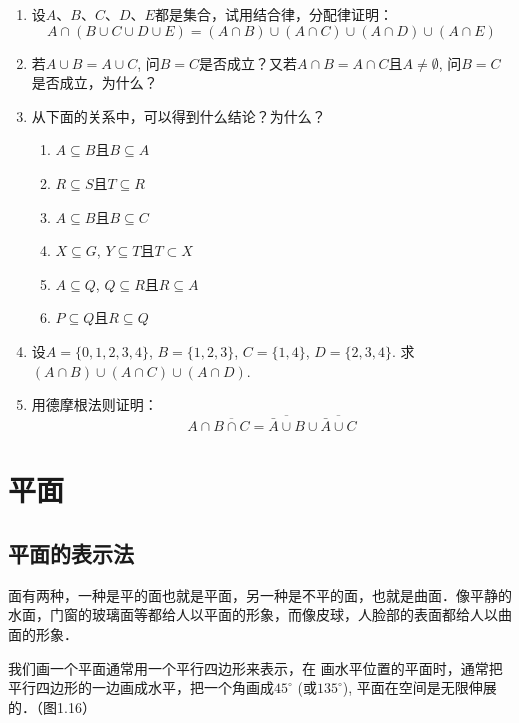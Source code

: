 \begin{enumerate}
\item   设$A$、$B$、$C$、$D$、$E$都是集合，试用结合律，分配律证明：
\[A\cap  (B\cup C\cup D\cup E)=(A\cap B)\cup (A\cap C)\cup (A\cap D)\cup (A\cap E)\] 
\item 若$A\cup B=A\cup C$, 问$B=C$是否成立？又若$A\cap B=A\cap C$且$A\ne \emptyset$, 问$B=C$是否成立，为什么？
\item 从下面的关系中，可以得到什么结论？为什么？
\begin{multicols}{2}
\begin{enumerate}
  \item $A\subseteq B$且$B\subseteq A$
  \item $R\subseteq S$且$T\subseteq R$
  \item $A\subseteq B$且$B\subseteq C$
  \item $X\subseteq G$, $Y\subseteq T$且$T\subset X$
  \item $A\subseteq Q$, $Q\subseteq R$且$R\subseteq A$
  \item $P\subseteq Q$且$R\subseteq Q$
\end{enumerate}
\end{multicols}

\item 设$A=\{0, 1, 2, 3, 4\}$, $B=\{1, 2, 3\}$, $C=\{1, 4\}$, 
  $D= \{2, 3, 4\}$. 求$(A\cap B)\cup (A\cap C)\cup (A\cap D)$.
\item 用德摩根法则证明：
\[A\cap \overline{B\cap C}=\overline{\bar A\cup B}\cup\overline{\bar A\cup C}\]
\end{enumerate}


\section{平面}

\subsection{平面的表示法}

面有两种，一种是平的面也就是平面，另一种是不平的面，也就是曲面．像平静的水面，门窗的玻璃面等都给人以平面的形象，而像皮球，人脸部的表面都给人以曲面的形象．

我们画一个平面通常用一个平行四边形来表示，在
画水平位置的平面时，通常把平行四边形的一边画成水平，把一个角画成$45^{\circ}$ (或$135^{\circ}$), 平面在空间是无限伸展的．（图1.16）

